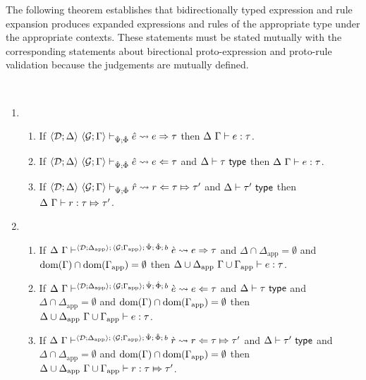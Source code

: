 The following theorem establishes that bidirectionally typed expression and rule expansion produces expanded expressions and rules of the appropriate type under the appropriate contexts. These statements must be stated mutually with the corresponding statements about birectional proto-expression and proto-rule validation because the judgements are mutually defined. 

\begingroup
\def\thetheorem{\ref{thm:typed-expansion-full-B}}
\begin{theorem} ~
\begin{enumerate}
  \item \begin{enumerate}
    \item If $\langle \mathcal{D}; \Delta \rangle~\langle \mathcal{G}; \Gamma \rangle \vdash_{\hat{\Psi}; \hat\Phi} {\hat e} \leadsto e \Rightarrow \tau$ then $\Delta~\Gamma \vdash e : \tau$.
    \item If $\langle \mathcal{D}; \Delta \rangle~\langle \mathcal{G}; \Gamma \rangle \vdash_{\hat{\Psi}; \hat\Phi} {\hat e} \leadsto e \Leftarrow \tau$ and $\Delta \vdash \tau~\mathsf{type}$ then $\Delta~\Gamma \vdash e : \tau$.
    \item If $\langle \mathcal{D}; \Delta \rangle~\langle \mathcal{G}; \Gamma \rangle \vdash_{\hat{\Psi}; \hat\Phi} \hat{r} \leadsto r \Leftarrow \tau \Mapsto \tau'$ and $\Delta \vdash \tau'~\mathsf{type}$ then $\Delta~\Gamma \vdash r : \tau \Mapsto \tau'$.
  \end{enumerate}
  \item \begin{enumerate}
    \item If $\Delta~\Gamma \vdash^{\langle \mathcal{D}; \Delta_\text{app} \rangle;\,\langle \mathcal{G}; \Gamma_\text{app} \rangle;\,\hat{\Psi};\,\hat\Phi;\,b} \grave{e} \leadsto e \Rightarrow \tau$ and $\Delta \cap \Delta_\text{app}=\emptyset$ and $\text{dom}(\Gamma) \cap \text{dom}(\Gamma_\text{app})=\emptyset$ then ${\Delta}\cup{\Delta_\text{app}}~{\Gamma}\cup{\Gamma_\text{app}} \vdash e : \tau$. 
    \item If $\Delta~\Gamma \vdash^{\langle \mathcal{D}; \Delta_\text{app} \rangle;\,\langle \mathcal{G}; \Gamma_\text{app} \rangle;\,\hat{\Psi};\,\hat\Phi;\,b} \grave{e} \leadsto e \Leftarrow \tau$ and $\Delta \vdash \tau~\mathsf{type}$ and $\Delta \cap \Delta_\text{app}=\emptyset$ and $\text{dom}(\Gamma) \cap \text{dom}(\Gamma_\text{app})=\emptyset$ then ${\Delta}\cup{\Delta_\text{app}}~{\Gamma}\cup{\Gamma_\text{app}} \vdash e : \tau$. 
    \item If $\Delta~\Gamma \vdash^{\langle \mathcal{D}; \Delta_\text{app} \rangle;\,\langle \mathcal{G}; \Gamma_\text{app} \rangle;\,\hat{\Psi};\,\hat\Phi;\,b} \grave{r} \leadsto r \Leftarrow \tau \Mapsto \tau'$ and $\Delta \vdash \tau'~\mathsf{type}$ and $\Delta \cap \Delta_\text{app}=\emptyset$ and $\text{dom}(\Gamma) \cap \text{dom}(\Gamma_\text{app})=\emptyset$ then ${\Delta}\cup{\Delta_\text{app}}~{\Gamma}\cup{\Gamma_\text{app}} \vdash r : \tau \Mapsto \tau'$.
  \end{enumerate}
\end{enumerate}
\end{theorem}

